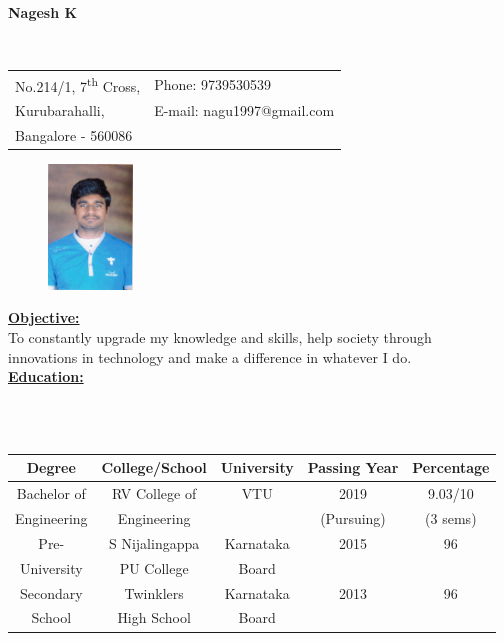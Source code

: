 \documentclass[10pt]{article}
\begin{document}
	
	
\begin{tabbing}
	\hspace{1.75in}
	\huge{\bf Nagesh K} %
\end{tabbing}
\hspace{-.05cm}\makebox[\linewidth]{\rule{20cm}{0.4pt}}
\vspace{.05 in} \\
\noindent\hspace{-1 in}
\begin{tabular}{@{}p{3.25in}p{3in}}
	
	No.214/1, 7\textsuperscript{th} Cross,             & {Phone:}  9739530539 \\
	Kurubarahalli, 
	& {E-mail:}  nagu1997@gmail.com\\
	Bangalore - 560086  
\end{tabular}

	\begin{figure}[h]
		\includegraphics[width=0.2\textwidth,right]{photo.png}
	\end{figure}
	
	
		\underline{\textbf{\Large{Objective:}}}\\
		
		To constantly upgrade my knowledge and skills, help society through\\ innovations in technology and make a difference in whatever I do.\\
		
	\underline{\textbf{\Large{Education:}}}
	\vspace{-0.5cm}
	
	\hfill\\
	\hfill\\
	\begin{tabular}{|c|c|c|c|c|}
		\hline
		\bf Degree & \bf College/School & \bf University & \bf Passing Year & \bf  Percentage \\
		\hline
		Bachelor of & RV College of & VTU & 2019 & 9.03/10\\
		Engineering &  Engineering &  & (Pursuing) & (3 sems)\\
		\hline
		Pre-& S Nijalingappa & Karnataka & 2015 & 96\\
		University & PU College & Board & &\\
		\hline
		Secondary & Twinklers & Karnataka & 2013 & 96 \\
		School & High School & Board & & \\
		\hline
	\end{tabular}
	
\end{document}
